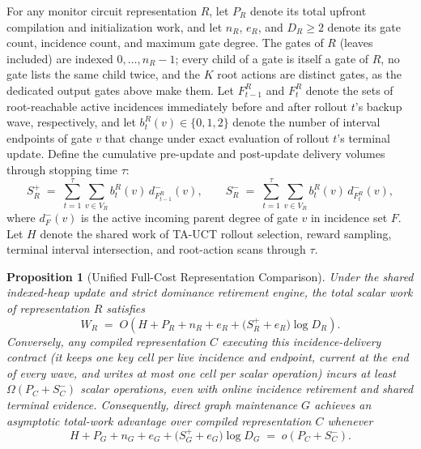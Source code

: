 \documentclass{article}
\theoremstyle{plain}
\newtheorem{proposition}[theorem]{Proposition}
\theoremstyle{definition}
\begin{document}
For any monitor circuit representation $R$, let $P_R$ denote its total upfront compilation and initialization work, and let $n_R$, $e_R$, and $D_R \ge 2$ denote its gate count, incidence count, and maximum gate degree. The gates of $R$ (leaves included) are indexed $0,\ldots,n_R-1$; every child of a gate is itself a gate of $R$, no gate lists the same child twice, and the $K$ root actions are distinct gates, as the dedicated output gates above make them. Let $F_{t-1}^R$ and $F_t^R$ denote the sets of root-reachable active incidences immediately before and after rollout $t$'s backup wave, respectively, and let $b_t^R(v) \in \{0,1,2\}$ denote the number of interval endpoints of gate $v$ that change under exact evaluation of rollout $t$'s terminal update. Define the cumulative pre-update and post-update delivery volumes through stopping time $\tau$:
\begin{equation}
\label{eq:s-plus-minus}
S_R^+ \;=\; \sum_{t=1}^{\tau} \sum_{v \in V_R} b_t^R(v)\, d_{F_{t-1}^R}^-(v), \qquad
S_R^- \;=\; \sum_{t=1}^{\tau} \sum_{v \in V_R} b_t^R(v)\, d_{F_t^R}^-(v),
\end{equation}
where $d_{F}^-(v)$ is the active incoming parent degree of gate $v$ in incidence set $F$. Let $H$ denote the shared work of TA-UCT rollout selection, reward sampling, terminal interval intersection, and root-action scans through $\tau$.

\begin{proposition}[Unified Full-Cost Representation Comparison]
\label{prop:representation-cost}
Under the shared indexed-heap update and strict dominance retirement engine, the total scalar work of representation $R$ satisfies
\begin{equation}
\label{eq:prop-rep-upper}
W_R \;=\; O\!\left(H + P_R + n_R + e_R + \bigl(S_R^+ + e_R\bigr)\log D_R\right).
\end{equation}
Conversely, any compiled representation $C$ executing this incidence-delivery contract (it keeps one key cell per live incidence and endpoint, current at the end of every wave, and writes at most one cell per scalar operation) incurs at least $\Omega(P_C + S_C^-)$ scalar operations, even with online incidence retirement and shared terminal evidence. Consequently, direct graph maintenance $G$ achieves an asymptotic total-work advantage over compiled representation $C$ whenever
\begin{equation}
\label{eq:representation-condition}
H + P_G + n_G + e_G + \bigl(S_G^+ + e_G\bigr)\log D_G \;=\; o\!\left(P_C + S_C^-\right). \tag{R}
\end{equation}
\end{proposition}
\end{document}
